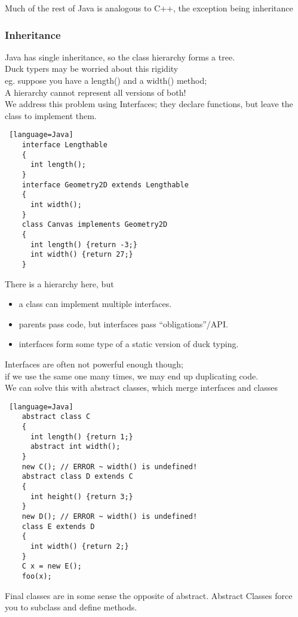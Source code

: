 \documentclass[../../lecture_notes.tex]{subfiles}
\begin{document}
\noindent Much of the rest of Java is analogous to C++, the exception being inheritance

\subsubsection*{Inheritance}
\noindent Java has single inheritance, so the class hierarchy forms a tree.\\
Duck typers may be worried about this rigidity\\
	\indent eg. suppose you have a length() and a width() method;\\
	\indent \indent A hierarchy cannot represent all versions of both!\\
We address this problem using Interfaces; they declare functions, but leave the class to implement them.\\
\begin{lstlisting} [language=Java]
	interface Lengthable
	{
	  int length();
	}
	interface Geometry2D extends Lengthable 
	{
	  int width();
	}
	class Canvas implements Geometry2D
	{
	  int length() {return -3;}
	  int width() {return 27;}
	}
\end{lstlisting}
\noindent There is a hierarchy here, but
\begin{itemize} [itemsep=0mm]
	\item a class can implement multiple interfaces.
	\item parents pass code, but interfaces pass “obligations”/API.
	\item interfaces form some type of a static version of duck typing.
\end{itemize}
\noindent Interfaces are often not powerful enough though;\\
\indent if we use the same one many times, we may end up duplicating code.\\
We can solve this with abstract classes, which merge interfaces and classes
\begin{lstlisting} [language=Java]
	abstract class C
	{
	  int length() {return 1;}
	  abstract int width();
	} 
	new C(); // ERROR ~ width() is undefined!
	abstract class D extends C
	{
	  int height() {return 3;}
	} 
	new D(); // ERROR ~ width() is undefined!
	class E extends D
	{
	  int width() {return 2;}
	}
	C x = new E();
	foo(x);
\end{lstlisting}
\noindent Final classes are in some sense the opposite of abstract.
\indent Abstract Classes force you to subclass and define methods.\\
\end{document}
